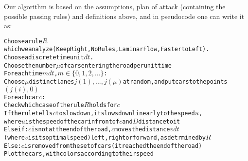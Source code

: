 \documentclass[12pt]{article}
\begin{document}
\begin{comment}

$t=0$  (initial time)\\

$cars=\emptyset$ (Initially, there are no cars)\\

$C=\{cars\}$\\

$V=\{velocities\}$\\

for $t\in \{0,dt, 2dt, ...,T\}$  (time is considered in discrete steps):\\

   Choose numbers $j_1,..,j_{\ell}$ at random from $\{1,2,...,N\}.$\\

   Put cars to the points $(0,j_i)$ to $C$ (new cars enter)\\
   
     for c in C:\\

         $c$ is moved forward by $v_idt$ if it is allowed by our rule\\
         
$c\to c+(v_idt,0)$ or $c\to (0,v_i dt)$ 
\end{comment}

           
Our algorithm is based on the assumptions, plan of attack (containing the possible passing rules) and definitions above, and in pseudocode one can write it as:\\

\begin{alltt}
Choose a rule \(R\) which we analyze (Keep Right, No Rules, Laminar Flow, Faster to Left).
Choose a discrete time unit \(dt\).
Choose the number \(\mu\) of cars entering the road per unit time
For each time \(mdt\), \(m\in \{0,1,2,...\}\):
   Choose \(\mu\) distinct  lanes \(j(1),...,j(\mu)\) at random, and put cars to the points \((j(i),0)\)
   For each car \(c\):
       Check which case of the rule \(R\) holds for \(c\)
       If the rule tells \(c\) to slow down, it slows down linearly to the speed \(u\),
           where \(u\) is the speed of the car in front of \(c\) and \(D\) distance to it
       Else if: \(c\) is not at the end of the road, \(c\) moves the distance \(vdt\)
           (where \(v\) is its optimal speed) left, right or forward, as detrmined by  \(R\)
       Else: \(c\) is removed from the set of cars (it reached the end of the road)
    Plot the cars, with colors according to their speed
\end{alltt}
    
\end{document}
